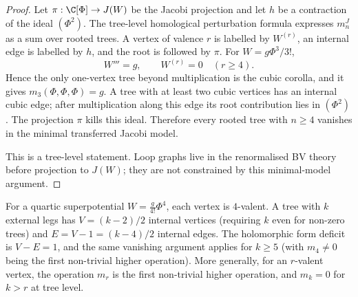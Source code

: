 \begin{proof}
Let \(\pi:\C[\Phi]\to J(W)\) be the Jacobi projection and let \(h\)
be a contraction of the ideal \((\Phi^2)\). The tree-level
homological perturbation formula expresses \(m_n^J\) as a sum over
rooted trees. A vertex of valence \(r\) is labelled by \(W^{(r)}\),
an internal edge is labelled by \(h\), and the root is followed by
\(\pi\). For \(W=g\Phi^3/3!\),
\[
W'''=g,\qquad W^{(r)}=0\quad(r\geq4).
\]
Hence the only one-vertex tree beyond multiplication is the cubic
corolla, and it gives \(m_3(\Phi,\Phi,\Phi)=g\). A tree with at least
two cubic vertices has an internal cubic edge; after multiplication
along this edge its root contribution lies in \((\Phi^2)\). The
projection \(\pi\) kills this ideal. Therefore every rooted tree with
\(n\geq4\) vanishes in the minimal transferred Jacobi model.

This is a tree-level statement. Loop graphs live in the renormalised BV
theory before projection to \(J(W)\); they are not constrained by this
minimal-model argument.
\end{proof}

\begin{remark}
For a quartic superpotential $W = \frac{g}{4!}\Phi^4$, each vertex is $4$-valent. A tree with $k$ external legs has $V = (k-2)/2$ internal vertices (requiring $k$ even for non-zero trees) and $E = V - 1 = (k-4)/2$ internal edges. The holomorphic form deficit is $V - E = 1$, and the same vanishing argument applies for $k \geq 5$ (with $m_4 \neq 0$ being the first non-trivial higher operation). More generally, for an $r$-valent vertex, the operation $m_r$ is the first non-trivial higher operation, and $m_k = 0$ for $k > r$ at tree level.
\end{remark}
